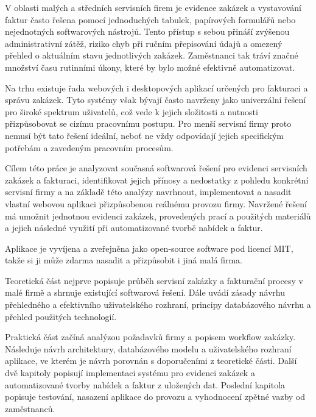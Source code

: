 
V oblasti malých a středních servisních firem je evidence zakázek a vystavování faktur často řešena pomocí jednoduchých tabulek, papírových formulářů nebo nejednotných softwarových nástrojů. Tento přístup s sebou přináší zvýšenou administrativní zátěž, riziko chyb při ručním přepisování údajů a omezený přehled o aktuálním stavu jednotlivých zakázek. Zaměstnanci tak tráví značné množství času rutinními úkony, které by bylo možné efektivně automatizovat.

Na trhu existuje řada webových i desktopových aplikací určených pro fakturaci a správu zakázek. Tyto systémy však bývají často navrženy jako univerzální řešení pro široké spektrum uživatelů, což vede k jejich složitosti a nutnosti přizpůsobovat se cizímu pracovnímu postupu. Pro menší servisní firmy proto nemusí být tato řešení ideální, neboť ne vždy odpovídají jejich specifickým potřebám a zavedeným pracovním procesům.

Cílem této práce je analyzovat současná softwarová řešení pro evidenci servisních zakázek a fakturaci, identifikovat jejich přínosy a nedostatky z pohledu konkrétní servisní firmy a na základě této analýzy navrhnout, implementovat a nasadit vlastní webovou aplikaci přizpůsobenou reálnému provozu firmy. Navržené řešení má umožnit jednotnou evidenci zakázek, provedených prací a použitých materiálů a jejich následné využití při automatizované tvorbě nabídek a faktur.

Aplikace je vyvíjena a zveřejněna jako open-source software pod licencí MIT, takže si ji může zdarma nasadit a přizpůsobit i jiná malá firma.

Teoretická část nejprve popisuje průběh servisní zakázky a fakturační procesy v malé firmě a shrnuje existující softwarová řešení. Dále uvádí zásady návrhu přehledného a efektivního uživatelského rozhraní, principy databázového návrhu a přehled použitých technologií.

Praktická část začíná analýzou požadavků firmy a popisem workflow zakázky. Následuje návrh architektury, databázového modelu a uživatelského rozhraní aplikace, ve kterém je návrh porovnán s doporučeními z teoretické části. Další dvě kapitoly popisují implementaci systému pro evidenci zakázek a automatizované tvorby nabídek a faktur z uložených dat. Poslední kapitola popisuje testování, nasazení aplikace do provozu a vyhodnocení zpětné vazby od zaměstnanců.

